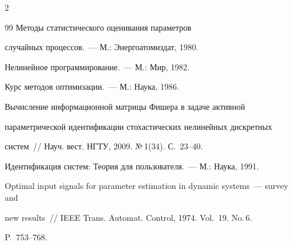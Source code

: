 \begin{multicols}{2}
{{\begin{thebibliography}{99}
 Методы статистического оценивания параметров


случайных процессов.~--- М.: Энергоатомиздат, 1980.









Нелинейное программирование.~--- М.: Мир, 1982.









Курс методов оптимизации.~--- М.: Наука, 1986.









Вычисление информационной матрицы Фишера в задаче активной


параметрической идентификации стохастических нелинейных дискретных


систем~// Науч. вест. НГТУ, 2009. №\,1(34). С.~23--40.









Идентификация систем: Теория для пользователя.~--- М.: Наука, 1991.





 \label{end\stat}









Optimal input signals for parameter estimation in dynamic systems~--- survey and


new results~// IEEE Trans. Automat. Control, 1974. Vol.~19. No.\,6.


P.~753--768.


 \end{thebibliography}


}


}








\end{multicols}


